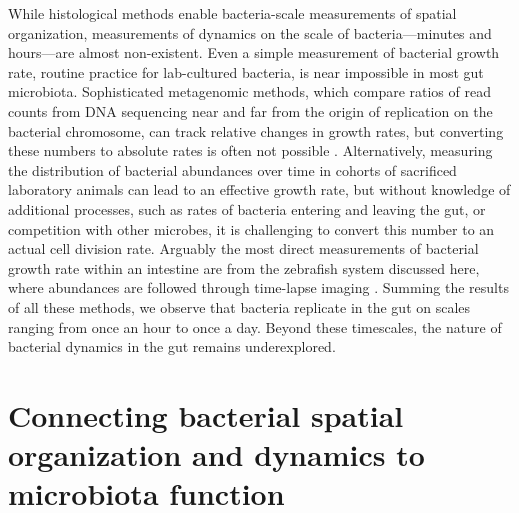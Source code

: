 While histological methods enable bacteria-scale measurements of spatial organization, measurements of dynamics on the scale of bacteria---minutes and hours---are almost non-existent. Even a simple measurement of bacterial growth rate, routine practice for lab-cultured bacteria, is near impossible in most gut microbiota. Sophisticated metagenomic methods, which compare ratios of read counts from DNA sequencing near and far from the origin of replication on the bacterial chromosome, can track relative changes in growth rates, but converting these numbers to absolute rates is often not possible \cite{korem2015growth}. Alternatively, measuring the distribution of bacterial abundances over time in cohorts of sacrificed laboratory animals can lead to an effective growth rate, but without knowledge of additional processes, such as rates of bacteria entering and leaving the gut, or competition with other microbes, it is challenging to convert this number to an actual cell division rate. Arguably the most direct measurements of bacterial growth rate within an intestine are from the zebrafish system discussed here, where abundances are followed through time-lapse imaging \cite{jemielita_spatial_2014,wiles_host_2016,schlomann_sublethal_2019}. Summing the results of all these methods, we observe that bacteria replicate in the gut on scales ranging from once an hour to once a day. Beyond these timescales, the nature of bacterial dynamics in the gut remains underexplored.

\section{Connecting bacterial spatial organization and dynamics to microbiota function}

